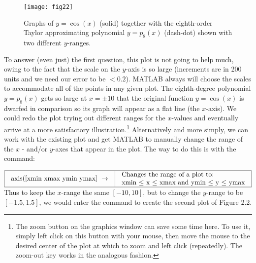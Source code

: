 \documentclass[../main.tex]{subfiles}
\begin{document}
\begin{figure}[H]
\centering
\texttt{[image: fig22]}
\caption{Graphs of $y=\cos (x)$ (solid) together with the eighth-order Taylor approximating polynomial $y=p_{8}(x)$ (dash-dot) shown with two different $y$-ranges.}
\label{fig:fig_2_2}
\end{figure}

To answer (even just) the first question, this plot is not going to help much, owing to the fact that the scale on the $y$-axis is so large (increments are in 200 units and we need our error to be $<0.2$). MATLAB always will choose the scales to accommodate all of the points in any given plot. The eighth-degree polynomial $y=p_{8}(x)$ gets so large at $x=\pm 10$ that the original function $y=\cos (x)$ is dwarfed in comparison so its graph will appear as a flat line (the $x$-axis). We could redo the plot trying out different ranges for the $x$-values and eventually arrive at a more satisfactory illustration.\footnote{ The zoom button \faSearchPluss \vspace{0.1cm}  on the graphics window can save some time here. To use it, simply left click on
this button with your mouse, then move the mouse to the desired center of the plot at which to zoom
and left click (repeatedly). The zoom-out key \faSearchMinuss \vspace{0.1cm}  works in the analogous fashion.} Alternatively and more simply, we can work with the existing plot and get MATLAB to manually change the range of the $x$ - and/or $y$-axes that appear in the plot. The way to do this is with the command:


$
\begin{array}{|l|l|}
\hline \begin{array}{l}
\text {axis([xmin xmax ymin ymax] } \rightarrow \\
\end{array} & \begin{array}{l}
\text {Changes the range of a plot to: } \\
\text {xmin $\leq$ x $\leq$ xmax  and ymin $\leq$ y $\leq$ ymax}\\

\end{array} \\
\hline
\end{array}
$\\

Thus to keep the $x$-range the same $[-10,10]$, but to change the $y$-range to be $[-1.5,1.5]$, we would enter the command to create the second plot of Figure 2.2.
\end{document}
